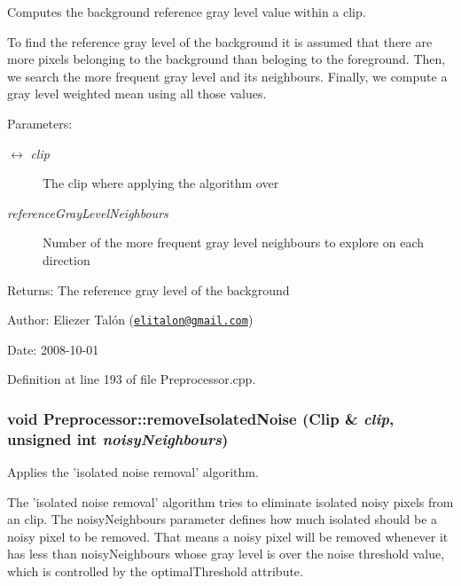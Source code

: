 Computes the background reference gray level value within a clip. 

To find the reference gray level of the background it is assumed that there are more pixels belonging to the background than beloging to the foreground. Then, we search the more frequent gray level and its neighbours. Finally, we compute a gray level weighted mean using all those values.

\begin{Desc}
\item[Parameters:]
\begin{description}
\item[\mbox{$\leftrightarrow$} {\em clip}]The clip where applying the algorithm over \item[{\em referenceGrayLevelNeighbours}]Number of the more frequent gray level neighbours to explore on each direction\end{description}
\end{Desc}
\begin{Desc}
\item[Returns:]The reference gray level of the background\end{Desc}
\begin{Desc}
\item[Author:]Eliezer Talón (\href{mailto:elitalon@gmail.com}{\tt elitalon@gmail.com}) \end{Desc}
\begin{Desc}
\item[Date:]2008-10-01 \end{Desc}


Definition at line 193 of file Preprocessor.cpp.\hypertarget{class_preprocessor_491c0dd6b38f870e22425d0e66ebc788}{
\subsubsection[removeIsolatedNoise]{\setlength{\rightskip}{0pt plus 5cm}void Preprocessor::removeIsolatedNoise ({\bf Clip} \& {\em clip}, \/  unsigned int {\em noisyNeighbours})}}
\label{class_preprocessor_491c0dd6b38f870e22425d0e66ebc788}


Applies the 'isolated noise removal' algorithm. 

The 'isolated noise removal' algorithm tries to eliminate isolated noisy pixels from an clip. The noisyNeighbours parameter defines how much isolated should be a noisy pixel to be removed. That means a noisy pixel will be removed whenever it has less than noisyNeighbours whose gray level is over the noise threshold value, which is controlled by the optimalThreshold attribute.

